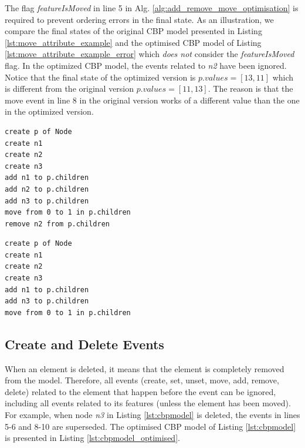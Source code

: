 \documentclass{llncs}
\begin{document}
The flag \emph{featureIsMoved} in line 5 in Alg. \ref{alg:add_remove_move_optimisation} is required to prevent ordering errors in the final state.
As an illustration, we compare the final states of the original CBP model presented in Listing  \ref{lst:move_attribute_example} and the optimised CBP model of Listing \ref{lst:move_attribute_example_error} which \emph{does not} consider the \emph{featureIsMoved} flag.
In the optimized CBP model, the events related to \emph{n2} have been ignored.
Notice that the final state of the optimized version is $p.values = [13, 11]$  which is different from the original version $p.values = [11,13]$.
The reason is that the move event in line 8 in the original version works of a different value than the one in the optimized version.

\noindent
\begin{minipage}[t]{0.48\linewidth}
\begin{lstlisting}[style=eol,caption={The CBP representation of reference \emph{children}'s move event.},label=lst:move_attribute_example]
create p of Node
create n1
create n2
create n3
add n1 to p.children
add n2 to p.children
add n3 to p.children
move from 0 to 1 in p.children
remove n2 from p.children
\end{lstlisting}
\end{minipage}
\hfill
\begin{minipage}[t]{0.48\linewidth}
\begin{lstlisting}[style=eol,caption={The optimised CBP representation of reference \emph{children}'s move event.},label=lst:move_attribute_example_error]
create p of Node
create n1
create n2
create n3
add n1 to p.children
add n3 to p.children
move from 0 to 1 in p.children
\end{lstlisting}
\end{minipage}


\subsection{Create and Delete Events}
\label{subsec:create_and_delete_operations}
When an element is deleted, it means that the element is completely removed from the model.
Therefore, all events (create, set, unset, move, add, remove, delete) related to the element that happen before the event can be ignored, including all events related to its features (unless the element has been moved).
For example, when node \emph{n3} in Listing \ref{lst:cbpmodel}  is deleted, the events in lines 5-6 and 8-10 are superseded.
The optimised CBP model of Listing \ref{lst:cbpmodel} is presented in Listing \ref{lst:cbpmodel_optimised}.
\end{document}
